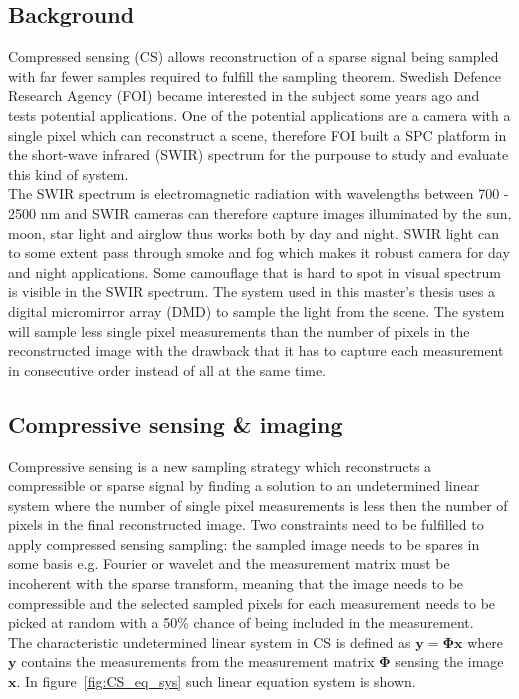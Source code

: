 \subsection{Background}
Compressed sensing (CS) allows reconstruction of a sparse signal being sampled with far fewer samples required to fulfill the sampling theorem. Swedish Defence Research Agency (FOI) became interested in the subject some years ago and tests potential applications. One of the potential applications are a camera with a single pixel which can reconstruct a scene, therefore FOI built a SPC platform in the short-wave infrared (SWIR) spectrum for the purpouse to study and evaluate this kind of system.\\[0.1in]

The SWIR spectrum is electromagnetic radiation with wavelengths between 700 - 2500 nm and SWIR cameras can therefore capture images illuminated by the sun, moon, star light and airglow thus works both by day and night. SWIR light can to some extent pass through smoke and fog which makes it robust camera for day and night applications. Some camouflage that is hard to spot in visual spectrum is visible in the SWIR spectrum. The system used in this master’s thesis uses a digital micromirror array (DMD) to sample the light from the scene. The system will sample less single pixel measurements than the number of pixels in the reconstructed image with the drawback that it has to capture each measurement in consecutive order instead of all at the same time.

\subsection{Compressive sensing \& imaging}
Compressive sensing is a new sampling strategy which reconstructs a compressible or sparse signal by finding a solution to an undetermined linear system where the number of single pixel measurements is less then the number of pixels in the final reconstructed image. Two constraints need to be fulfilled to apply compressed sensing sampling: the sampled image needs to be spares in some basis e.g. Fourier or wavelet and the measurement matrix must be incoherent with the sparse transform, meaning that the image needs to be compressible and the selected sampled pixels for each measurement needs to be picked at random with a 50\% chance of being included in the measurement. \\[0.1in]

The characteristic  undetermined linear system in CS is defined as $ \mathbf{y} = \mathbf{\Phi}\mathbf{x}$ where $\mathbf{y}$ contains the measurements from the measurement matrix $\mathbf{\Phi}$ sensing the image $\mathbf{x}$. In figure~\ref{fig:CS_eq_sys} such linear equation system is shown.

